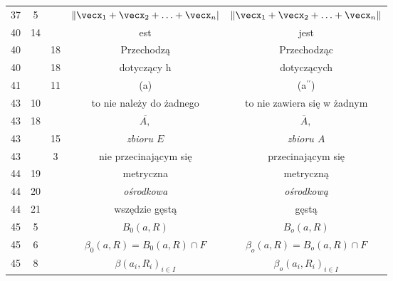 \documentclass[a4paper,11pt]{article}
\numberwithin{equation}{section}
\begin{document}
\begin{center}
\begin{tabular}{|c|c|c|c|c|}
    37  &  5 & & $\Vert \vecx_{ 1 } + \vecx_{ 2 } + \ldots + \vecx_{ n } |$
           & $\Vert \vecx_{ 1 } + \vecx_{ 2 } + \ldots + \vecx_{ n } \Vert$ \\
    40  & 14 & & est & jest \\
    40  & & 18 & Przechodzą & Przechodząc \\
    40  & & 18 & dotyczący h & dotyczących \\
    41  & & 11 & (a) & (a$^{ \prime\prime }$) \\
    43  & 10 & & to nie należy do żadnego & to nie zawiera się w żadnym \\
    43  & 18 & & $\overline{A,}$ & $\overline{A},$ \\
    43  & & 15 & \textit{zbioru $E$} & \textit{zbioru $A$} \\
    43  & &  3 & nie przecinającym się & przecinającym się \\
    44  & 19 & & metryczna & metryczną \\
    44  & 20 & & \textit{ośrodkowa} & \textit{ośrodkową} \\
    44  & 21 & & wszędzie gęstą & gęstą \\
    45  &  5 & & $B_{ 0 }( a, R )$ & $B_{ o }( a, R )$ \\
    45  &  6 & & $\beta_{ 0 }( a, R ) = B_{ 0 }( a, R ) \cap F$
           & $\beta_{ o }( a, R ) = B_{ o }( a, R ) \cap F$ \\
    45  &  8 & & $\beta( a_{ i }, R_{ i } )_{ i \in I }$
           & $\beta_{ o }( a_{ i }, R_{ i } )_{ i \in I }$ \\
    \hline
  \end{tabular}






\end{center}
\end{document}
